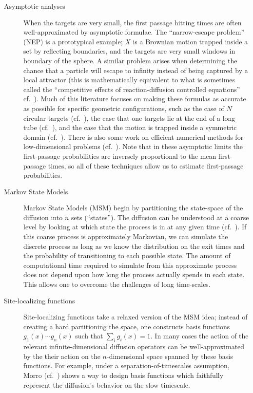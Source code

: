 \documentclass[12pt, nofootinbib,english, amsmath, amssymb, aps, priprint, graphicx,floatfix]{revtex4-1}
\theoremstyle{plain}
\theoremstyle{definition}
\theoremstyle{plain}
\begin{document}
\begin{description}
    \item[Asymptotic analyses] When the targets are very small, the first passage hitting times are often well-approximated by asymptotic formulae.  The ``narrow-escape problem'' (NEP) is a prototypical example; $X$ is a Brownian motion trapped inside a set by reflecting boundaries, and the targets are very small windows in boundary of the sphere.  A similar problem arises when determining the chance that a particle will escape to infinity instead of being captured by a local attractor (this is mathematically equivalent to what is sometimes called the ``competitive effects of reaction-diffusion controlled equations'' cf.\ \cite{Samson1977-je,Deutch1976-eq}).   Much of this literature focuses on making these formulas as accurate as possible for specific geometric configurations, such as the case of $N$ circular targets (cf.\ \cite{cheviakov2010asymptotic}), the case that one targets lie at the end of a long tube (cf.\ \cite{li2014matched}), and the case that the motion is trapped inside a symmetric domain (cf.\ \cite{Chevalier2010-bq,Condamin2006-vi,Coombs2009-pe,Lindsay2017-ds}).  There is also some work on efficient numerical methods for low-dimensional problems (cf.\ \cite{kaye2019fast}).  Note that in these asymptotic limits the first-passage probabilities are inversely proportional to the mean first-passage times, so all of these techniques allow us to estimate first-passage probabilities.  

    \item[Markov State Models] Markov State Models (MSM) begin by partitioning the state-space of the diffusion into $n$ sets (``states'').  The diffusion can be understood at a coarse level by looking at which state the process is in at any given time (cf.\ \cite{Pande2010-yi, Chodera2014-bh, Husic2018-xp}).   If this coarse process is approximately Markovian, we can simulate the discrete process as long as we know the distribution on the exit times and the probability of transitioning to each possible state.  The amount of computational time required to simulate from this approximate process does not depend upon how long the process actually spends in each state.  This allows one to overcome the challenges of long time-scales.  

    \item[Site-localizing functions] Site-localizing functions take a relaxed version of the MSM idea; instead of creating a hard partitioning the space, one constructs basis functions $g_1(x)\cdots g_n(x)$ such that $\sum_i g_i(x)=1$.  In many cases the action of the relevant infinite-dimensional diffusion operators can be well-approximated by the their action on the $n$-dimensional space spanned by these basis functions.   For example, under a separation-of-timescales assumption, Morro (cf.\ \cite{moro1995kinetic}) shows a way to design basis functions which faithfully represent the diffusion's behavior on the slow timescale.


\end{description}
\end{document}

